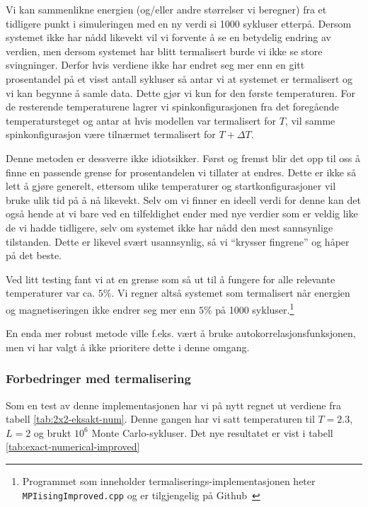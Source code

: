 \documentclass[11pt]{article}
\begin{document}
Vi kan sammenlikne energien (og/eller andre størrelser vi beregner)
fra et tidligere punkt i simuleringen med en ny verdi si 1000 sykluser
etterpå. Dersom systemet ikke har nådd likevekt vil vi forvente å se
en betydelig endring av verdien, men dersom systemet har blitt
termalisert burde vi ikke se store svingninger. Derfor hvis verdiene ikke har endret
seg mer enn en gitt prosentandel på et visst antall sykluser så antar vi at
systemet er termalisert og vi kan begynne å samle data. Dette gjør vi
kun for den første temperaturen. For de resterende temperaturene lagrer
vi spinkonfigurasjonen fra det foregående temperatursteget og antar at hvis
modellen var termalisert for $T$, vil samme spinkonfigurasjon være tilnærmet
termalisert for $T+ \Delta T$.

Denne metoden er dessverre ikke idiotsikker. Først og fremst blir
det opp til oss å finne en passende grense for prosentandelen vi
tillater at endres. Dette er ikke så lett å gjøre generelt, ettersom
ulike temperaturer og startkonfigurasjoner vil bruke ulik tid på å nå
likevekt. Selv om vi finner en ideell verdi for denne kan det også hende
at vi bare ved en tilfeldighet ender med nye verdier som er veldig
like de vi hadde tidligere, selv om systemet ikke har nådd den mest
sannsynlige tilstanden. Dette er likevel svært usannsynlig, så vi
``krysser fingrene'' og håper på det beste.

Ved litt testing fant vi at en grense som så ut til å fungere for alle relevante
temperaturer var ca. $5\%$. Vi regner altså systemet som termalisert når
energien og magnetiseringen ikke endrer seg mer enn $5 \%$ på 1000 sykluser.\footnote{Programmet som inneholder termaliserings-implementasjonen heter \texttt{MPIisingImproved.cpp} og er
tilgjengelig på Github~\cite{github-repo}}

En enda mer robust metode ville f.eks. vært å bruke autokorrelasjonsfunksjonen,
men vi har valgt å ikke prioritere dette i denne omgang.

\subsubsection{Forbedringer med termalisering}
Som en test av denne implementasjonen har vi på nytt regnet ut
verdiene fra tabell \ref{tab:2x2-eksakt-num}. Denne gangen har vi satt
temperaturen til $T=2.3$, $L=2$ og brukt $10^6$ Monte
Carlo-sykluser. Det nye resultatet er vist i tabell \ref{tab:exact-numerical-improved}
\end{document}
